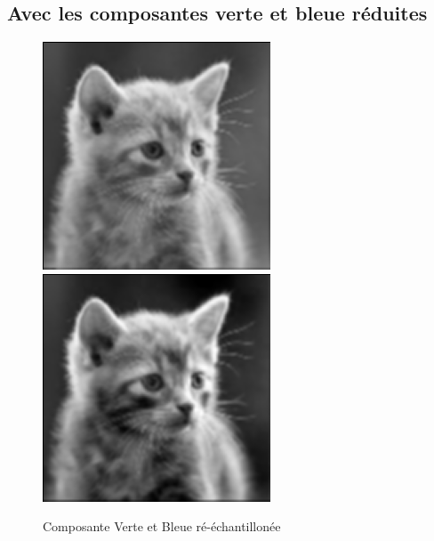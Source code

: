 \documentclass{article}
\begin{document}
\subsection{Avec les composantes verte et bleue réduites}

\begin{figure}[h]
\centerline{\includegraphics[scale=0.7]{./rendus/ResizeGreen.png} \includegraphics[scale=0.7]{./rendus/ResizeBlue.png} }
\caption{Composante Verte et Bleue ré-échantillonée }
\end{figure}
\end{document}

